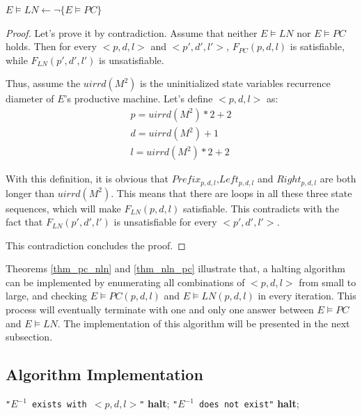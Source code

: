\documentclass[journal]{IEEEtran}
\begin{document}
\begin{theorem}[]\label{thm_nln_pc}
$E\vDash LN\gets \neg \{E\vDash PC\}$
\end{theorem}
\begin{proof}
Let's prove it by contradiction.
Assume that neither $E\vDash LN$ nor $E\vDash PC$ holds.
Then for every $<p,d,l>$ and $<p',d',l'>$,
$F_{PC}(p,d,l)$ is satisfiable,
while $F_{LN}(p',d',l')$ is unsatisfiable.

Thus,
assume the $uirrd(M^2)$ is the uninitialized state variables recurrence diameter of $E$'s productive machine.
Let's define $<p,d,l>$ as:
\begin{equation}
\begin{array}{c}
p=uirrd(M^2)*2+2 \\
d=uirrd(M^2)+1 \\
l=uirrd(M^2)*2+2
\end{array}
\end{equation}

With this definition,
it is obvious that $Prefix_{p,d,l}$,$Left_{p,d,l}$ and $Right_{p,d,l}$ are both longer than $uirrd(M^2)$.
This means that there are loops in all these three state sequences,
which will make $F_{LN}(p,d,l)$ satisfiable.
This contradicts with the fact that $F_{LN}(p',d',l')$ is unsatisfiable for every $<p',d',l'>$.

This contradiction concludes the proof.
\end{proof}

Theorems \ref{thm_pc_nln} and \ref{thm_nln_pc} illustrate that,
a halting algorithm can be implemented by
enumerating all combinations of $<p,d,l>$ from small to large,
and checking $E\vDash PC(p,d,l)$ and $E\vDash LN(p,d,l)$ in every iteration.
This process will eventually terminate with one and only one answer between $E\vDash PC$ and $E\vDash LN$.
The implementation of this algorithm will be presented in the next subsection.

\subsection{Algorithm Implementation}\label{subsec_algoimp}

\begin{algorithm}
\caption{$check\_PCLN$}
\label{algo_pcln}
\begin{algorithmic}[1]
        \PRINT \texttt{"$E^{-1}$ exists with $<p,d,l>$"}\label{lab_pc}
        \STATE \textbf{halt};
        \PRINT \texttt{"$E^{-1}$ does not exist"}\label{lab_ln}
        \STATE \textbf{halt};
      \ENDIF
\ENDFOR
\end{algorithmic}
\end{algorithm}
\end{document}
